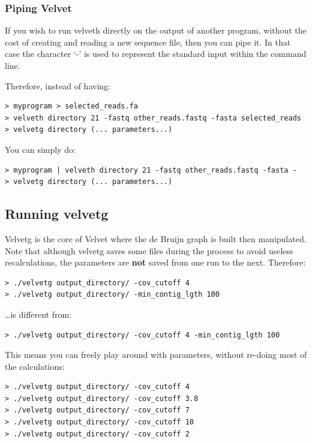\documentclass{article}
\begin{document}
\subsubsection{Piping Velvet}

If you wish to run velveth directly on the output of another program, without the cost of creating and reading a new sequence file, then you can pipe it. In that case the character `-' is used to represent the standard input within the command line. 

Therefore, instead of having:

\begin{verbatim}
> myprogram > selected_reads.fa
> velveth directory 21 -fastq other_reads.fastq -fasta selected_reads
> velvetg directory (... parameters...) 
\end{verbatim}

You can simply do:

\begin{verbatim}
> myprogram | velveth directory 21 -fastq other_reads.fastq -fasta -
> velvetg directory (... parameters...) 
\end{verbatim}

\subsection{Running velvetg}

Velvetg is the core of Velvet where the de Bruijn graph is built then manipulated. Note that although velvetg saves some files during the process to avoid useless recalculations, the parameters are \textbf{not} saved from one run to the next. Therefore:

\begin{verbatim}
> ./velvetg output_directory/ -cov_cutoff 4
> ./velvetg output_directory/ -min_contig_lgth 100
\end{verbatim}

\ldots is different from:

\begin{verbatim}
> ./velvetg output_directory/ -cov_cutoff 4 -min_contig_lgth 100
\end{verbatim}

This means you can freely play around with parameters, without re-doing most of the calculations:

\begin{verbatim}
> ./velvetg output_directory/ -cov_cutoff 4
> ./velvetg output_directory/ -cov_cutoff 3.8
> ./velvetg output_directory/ -cov_cutoff 7
> ./velvetg output_directory/ -cov_cutoff 10
> ./velvetg output_directory/ -cov_cutoff 2
\end{verbatim}
\end{document}
